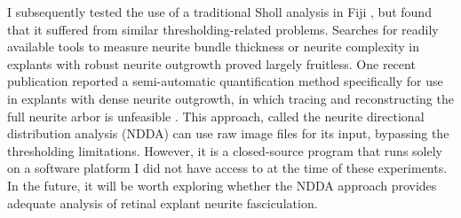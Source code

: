 I subsequently tested the use of a traditional Sholl analysis in Fiji \cite{ferreira2014neuronal}, but found that it suffered from similar thresholding-related problems.
Searches for readily available tools to measure neurite bundle thickness or neurite complexity in explants with robust neurite outgrowth proved largely fruitless.
One recent publication reported a semi-automatic quantification method specifically for use in explants with dense neurite outgrowth, in which tracing and reconstructing the full neurite arbor is unfeasible \cite{hopkins2014semi}.
This approach, called the neurite directional distribution analysis (NDDA) can use raw image files for its input, bypassing the thresholding limitations.
However, it is a closed-source program that runs solely on a software platform I did not have access to at the time of these experiments.
In the future, it will be worth exploring whether the NDDA approach provides adequate analysis of retinal explant neurite fasciculation.

